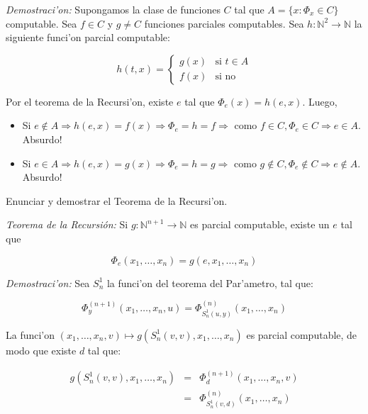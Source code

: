 \begin{questions}
\begin{solution}
  {\it Demostraci'on:} Supongamos la clase de funciones $C$ tal que $A = \{ x : \Phi_x \in C \}$ computable. Sea $f \in C$ y $g \neq C$ funciones parciales computables. Sea $h : \mathbb{N}^2 \rightarrow \mathbb{N}$ la siguiente funci'on parcial computable: 

  $$
  h(t,x) = \left\{
  \begin{array}{cl}
  g(x) & \mbox{si } t \in A \\
  f(x) & \mbox{si no}
  \end{array}\right.
  $$

  Por el teorema de la Recursi'on, existe $e$ tal que $\Phi_e(x) = h(e,x)$. Luego, 

  \begin{itemize}
  \item Si $e\notin A \Rightarrow h(e,x) = f(x)\Rightarrow \Phi_e=h=f\Rightarrow$ como $f\in C, \Phi_e \in C \Rightarrow e \in A$. Absurdo! 
  \item Si $e\in A \Rightarrow h(e,x) = g(x)\Rightarrow \Phi_e=h=g\Rightarrow$ como $g\notin C, \Phi_e \notin C \Rightarrow e \notin A$. Absurdo! 
  \end{itemize}

  \end{solution}

  \question Enunciar y demostrar el Teorema de la Recursi'on.
  \begin{solution}
  
  {\it Teorema de la Recursi\'on:} Si $g : \mathbb{N}^{n+1} \rightarrow \mathbb{N}$ es parcial computable, existe un $e$ tal que

  \begin{equation*}
  \Phi_e(x_1, \dots, x_n) = g(e, x_1, \dots, x_n)
  \end{equation*}

  {\it Demostraci'on:} Sea $S_n^1$ la funci'on del teorema del Par'ametro, tal que: 

  \begin{equation*}
  \Phi_y^{(n+1)}(x_1, \dots, x_n, u) = \Phi_{S_n^1(u,y)}^{(n)}(x_1, \dots, x_n)
  \end{equation*}

  La funci'on $(x_1, \dots, x_n, v) \mapsto g(S_n^1(v,v), x_1, \dots, x_n)$ es parcial computable, de modo que existe $d$ tal que: 

  \begin{eqnarray*}
  g(S_n^1(v,v), x_1, \dots, x_n) &=& \Phi_d^{(n+1)}(x_1, \dots, x_n, v) \\
				  &=& \Phi_{S_n^1(v,d)}^{(n)}(x_1, \dots, x_n)
  \end{eqnarray*}


\end{solution}
\end{questions}

